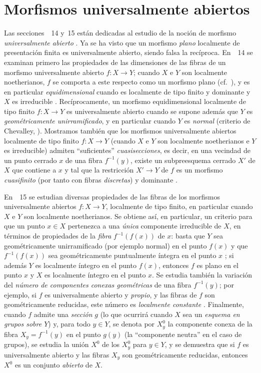 \section{Morfismos universalmente abiertos}
\label{section:IV.14}

Las secciones~\textsection\textsection~14 y~15 están dedicadas al estudio de la noción de morfismo \emph{universalmente abierto} .
Ya se ha visto  que un morfismo \emph{plano} localmente de presentación finita es universalmente abierto, siendo falsa la recíproca.
En~\textsection~14 se examinan primero las propiedades de las dimensiones de las fibras de un morfismo universalmente abierto $f:X\to Y$; cuando $X$ e $Y$ son localmente noetherianos, $f$ se comporta a este respecto  como un morfismo plano (cf.~), y es en particular \emph{equidimensional} cuando es localmente de tipo finito y dominante y $X$ es irreducible .
Recíprocamente, un morfismo equidimensional localmente de tipo finito $f:X\to Y$ es universalmente abierto cuando se supone además que $Y$ es \emph{geométricamente unirramificado}, y en particular cuando $Y$ es \emph{normal} (criterio de Chevalley, ).
Mostramos también que los morfismos universalmente abiertos localmente de tipo finito $f:X\to Y$ (cuando $X$ e $Y$ son
localmente noetherianos e $Y$ es irreducible) admiten ``suficientes'' \emph{cuasisecciones}, es decir, en una vecindad de un punto cerrado $x$ de una fibra $f^{-1}(y)$, existe un subpreesquema cerrado $X'$ de $X$ que contiene a $x$ y tal que la restricción $X'\to Y$ de $f$ es un morfismo \emph{cuasifinito} (por tanto con fibras \emph{discretas}) y dominante .

En~\textsection~15 se estudian diversas propiedades de las fibras de los morfismos universalmente abiertos $f:X\to Y$, localmente de tipo finito, en particular cuando $X$ e $Y$ son localmente noetherianos.
Se obtiene así, en particular, un criterio para que un punto $x\in X$ pertenezca a una \emph{única} componente irreducible de $X$, en términos de propiedades de la \emph{fibra} $f^{-1}(f(x))$ de $x$: basta que $Y$ sea geométricamente unirramificado (por ejemplo normal) en el punto $f(x)$ y que $f^{-1}(f(x))$ sea geométricamente puntualmente íntegra en el punto $x$ ; si además $Y$ es localmente íntegro en el punto $f(x)$, entonces $f$ es plano en el punto $x$ y $X$ es localmente íntegro en el punto $x$.
Se estudia también la variación del \emph{número de componentes conexas geométricas} de una fibra $f^{-1}(y)$; por ejemplo, si $f$ es universalmente abierto y \emph{propio}, y las fibras de $f$ son geométricamente reducidas, este número es \emph{localmente constante} .
Finalmente, cuando $f$ admite una \emph{sección} $g$ (lo que ocurrirá cuando $X$ sea un \emph{esquema en grupos sobre $Y$}) y, para todo $y\in Y$, se denota por $X_y^0$ la componente conexa de la fibra $X_y=f^{-1}(y)$ en el punto $g(y)$ (la ``componente neutra'' en el caso de grupos), se estudia la unión $X^0$ de los $X_y^0$ para $y\in Y$, y se demuestra  que si $f$ es universalmente abierto y las fibras $X_y$ son geométricamente reducidas, entonces $X^0$ es un conjunto \emph{abierto} de $X$.

